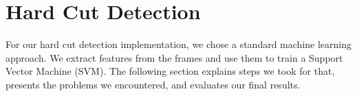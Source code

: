 \section{Hard Cut Detection}
\label{sec:hard_cut}

For our hard cut detection implementation, we chose a standard machine learning approach.
We extract features from the frames and use them to train a Support Vector Machine (SVM).
The following section explains steps we took for that, presents the problems we encountered, and evaluates our final results.




